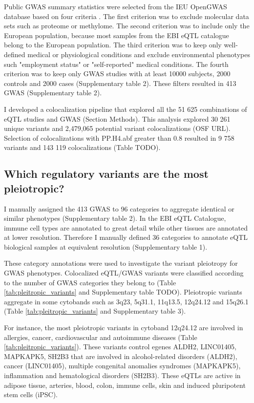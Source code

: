 Public GWAS summary statistics were selected from the IEU OpenGWAS database based on four criteria \citep{2018.Parkinson.Buniello}.
%
The first criterion was to exclude molecular data sets such as proteome or methylome.
%	
The second criterion was to include only the European population, because most samples from the EBI eQTL catalogue belong to the European population.
%
The third criterion was to keep only well-defined medical or physiological conditions and exclude environmental phenotypes such "employment status" or "self-reported" medical conditions.
%
The fourth criterion was to keep only GWAS studies with at least 10000 subjects, 2000 controls and 2000 cases (Supplementary table 2).
%
These filters resulted in 413 GWAS (Supplementary table 2).

I developed a colocalization pipeline that explored all the 51 625 combinations of eQTL studies and GWAS (Section Methods).
%
This analysis explored 30 261 unique variants and 2,479,065 potential variant colocalizations (OSF URL).
%
Selection of colocalizations with PP.H4.abf greater than 0.8 resulted in 9 758 variants and 143 119 colocalizations (Table TODO).

\subsection*{Which regulatory variants are the most pleiotropic?}

I manually assigned the 413 GWAS to 96 categories to aggregate identical or similar phenotypes (Supplementary table 2).
%
In the EBI eQTL Catalogue, immune cell types are annotated to great detail while other tissues are annotated at lower resolution.
%
Therefore I manually defined 36 categories to annotate eQTL biological samples at equivalent resolution (Supplementary table 1).

These category annotations were used to investigate the variant pleiotropy for GWAS phenotypes.
%
Colocalized eQTL/GWAS variants were classified according to the number of GWAS categories they belong to (Table \ref{tab:pleitropic_variants} and Supplementary table TODO).
%
Pleiotropic variants aggregate in some cytobands such as 3q23, 5q31.1, 11q13.5, 12q24.12 and 15q26.1 (Table \ref{tab:pleitropic_variants} and Supplementary table 3).

For instance, the most pleiotropic variants in cytoband 12q24.12 are involved in allergies, cancer, cardiovascular and autoimmune diseases (Table \ref{tab:pleitropic_variants}).
%
These variants control egenes ALDH2, LINC01405, MAPKAPK5, SH2B3 that are involved in alcohol-related disorders (ALDH2), cancer (LINC01405), multiple congenital anomalies syndromes (MAPKAPK5),  inflammation and hematological disorders (SH2B3).
%
These eQTLs are active in adipose tissue, arteries, blood, colon, immune cells, skin and induced pluripotent stem cells (iPSC).

